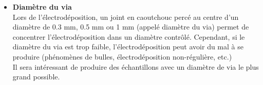 \begin{itemize}
    \item \textbf{Diamètre du via}\\
          Lors de l'électrodéposition, un joint en caoutchouc percé au centre d'un diamètre de 0.3 mm, 0.5 mm ou 1 mm (appelé diamètre du via) permet de concentrer
          l'électrodéposition dans un diamètre contrôlé. Cependant, si le diamètre du via est trop faible, l'électrodéposition peut avoir du mal à
          se produire (phénomènes de bulles, électrodéposition non-régulière, etc.)\\
          Il sera intéressant de produire des échantillons avec un diamètre de via le plus grand possible. 
\end{itemize}